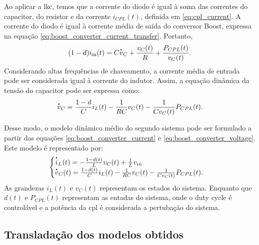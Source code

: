 Ao aplicar a \acrshort{lkc}, temos que a corrente do diodo é igual à soma das correntes do capacitor, do resistor e da corrente $i_{CPL}(t)$, definida em \eqref{eq:cpl_current}. A corrente do diodo é igual à corrente média de saída do conversor Boost, expressa na equação \eqref{eq:boost_converter_current_transfer}. Portanto, \begin{equation} (1 - d) i_{\text{in}}(t) = C\dt{v}_C + \frac{v_C(t)}{R} + \frac{P_{CPL}(t)}{v_C(t)}.\end{equation} Considerando altas frequências de chaveamento, a corrente média de entrada pode ser considerada igual à corrente do indutor. Assim, a equação dinâmica da tensão do capacitor pode ser expressa como: \begin{equation} \dt{v}_C = \frac{1 - d}{C} i_L(t) - \frac{1}{RC}v_C(t) - \frac{1}{Cv_C(t)}P_{CPL}(t). \label{eq:boost_converter_voltage}\end{equation}

Desse modo, o modelo dinâmico médio do segundo sistema pode ser formulado a partir das equações \eqref{eq:boost_converter_current} e \eqref{eq:boost_converter_voltage}. Este modelo é representado por: \begin{equation} \begin{cases} \dt{i}_L(t) = - \frac{1-d(t)}{L}v_C(t) + \frac{1}{L}v_{in} \\ \dt{v}_C(t) = \frac{1 - d(t)}{C} i_L(t) - \frac{1}{RC}v_C(t) - \frac{1}{Cv_C(t)}P_{CPL}(t). \label{eq:boost_nonlinear_system}\end{cases} \end{equation} As grandezas $i_L(t)$ e $v_C(t)$ representam os estados do sistema. Enquanto que $d(t)$ e $P_{CPL}(t)$ representam as entadas do sistema, onde o duty cycle é controlável e a potência da \acrshort{cpl} é considerada a pertubação do sistema.

\subsection{Transladação dos modelos obtidos}

